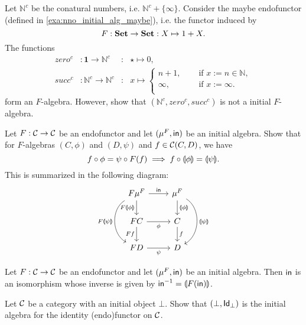 \begin{exer}\label{exer:conatural_numbers_are_not_initial}
Let $\mathbb{N}^{c}$ be the conatural numbers, i.e. $\mathbb{N}^{c} + \{\infty\}$. Consider the maybe endofunctor (defined in \cref{exa:nno_initial_alg_maybe}), i.e. the functor induced by
\[
F : \SET\to\SET : X\mapsto 1 + X.
\]
The functions 
\begin{align*}
zero^{c} &: \mathbf{1}\to \mathbb{N}^{c} &:& \star\mapsto 0,\\
succ^{c} &: \mathbb{N}^{c}\to \mathbb{N}^{c} &:& x\mapsto 
\begin{cases}
n+1,\quad &\text{ if } x := n\in\mathbb{N},\\
\infty,\quad &\text{ if } x := \infty.\\
\end{cases}
\end{align*}
form an $F$-algebra. However, show that $(\mathbb{N}^{c},zero^{c},succ^{c})$ is not a initial $F$-algebra.
\end{exer}

\begin{exer}\label{exer:fusion-property}
  Let $F:\CC\to\CC$ be an endofunctor and let $(\Initalg F, \In)$ be an initial algebra. Show that
  for $F$-algebras $(C,\phi)$ and $(D,\psi)$ and $f\in\CHom{\CC}{C}{D}$, we have 
\[
\co{\phi}{f} = \co{F(f)}{\psi} \implies \co{\catam{\phi}}{f} = \catam{\psi}.
\]
This is summarized in the following diagram:
\begin{equation}\label{eq:initial-f-alg-composition}
\begin{tikzcd}
F\Initalg{F} 
\arrow[r, "\In"] 
\arrow[d,swap, "F\catam{\phi}"]
\ar[dd, bend right=60, "F\catam{\psi}"']
&
\Initalg{F}
\arrow[d, "\catam{\phi}"]
\ar[dd, bend left=60, "\catam{\psi}"]
\\
FC
\arrow[r, swap, "\phi"]
\ar[d, "Ff"'] 
&
C \ar[d, "f"]
\\
FD \ar[r, "\psi"']
&
D
\end{tikzcd}
\end{equation}
\end{exer}

\begin{exer} Let $F:\CC\to\CC$ be an endofunctor and let $(\mu^F, \In)$ be an initial algebra.
  Then $\In$ is an isomorphism whose inverse is given by $\Inv{\In} = \catam{F(\In)}$.
\end{exer}

\begin{exer}\label{exer:initialalg_for_idfun_with_initialob} Let $\CC$ be a category with an initial object $\bot$. Show that $(\bot, \Id[\bot])$ is the initial algebra for the identity (endo)functor on $\CC$.
\end{exer}

